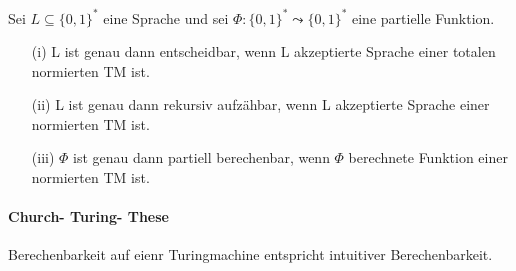   Sei \(L \subseteq \{0, 1\}^*\) eine Sprache und sei \(\Phi : \{0, 1\}^* \leadsto \{0, 1\}^*\) eine partielle Funktion.
  \begin{itemize}
    \item [(i)] L ist genau dann entscheidbar, wenn L akzeptierte Sprache einer totalen normierten TM ist. 
    \item [(ii)] L ist genau dann rekursiv aufzähbar, wenn L akzeptierte Sprache einer normierten TM ist.
    \item [(iii)] \(\Phi\) ist genau dann partiell berechenbar, wenn \(\Phi\) berechnete Funktion einer normierten TM ist.
  \end{itemize}

\paragraph*{Church- Turing- These} Berechenbarkeit auf eienr Turingmachine entspricht intuitiver Berechenbarkeit.

